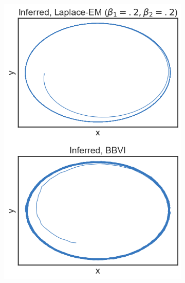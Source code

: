 \begin{figure}
\begin{subfigure}[b]{0.33\linewidth}
        \includegraphics[width=\linewidth]{./Figures/bautin-unstab.png}
        \caption{}
        \label{bautinresults:b}
        \vspace{4ex}
    \end{subfigure}%
    \begin{subfigure}[b]{0.33\linewidth}
        \centering

\end{subfigure}
\end{figure}
